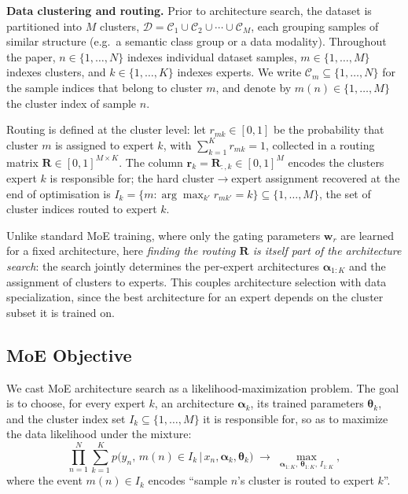 \textbf{Data clustering and routing.}
Prior to architecture search, the dataset is partitioned into $M$ clusters,
$\mathcal{D} = \mathcal{C}_1 \cup \mathcal{C}_2 \cup \cdots \cup \mathcal{C}_M$,
each grouping samples of similar structure (e.g.\ a semantic class group or a data modality). Throughout the paper, $n \in \{1, \ldots, N\}$ indexes individual dataset samples, $m \in \{1, \ldots, M\}$ indexes clusters, and $k \in \{1, \ldots, K\}$ indexes experts. We write $\mathcal{C}_m \subseteq \{1, \ldots, N\}$ for the sample indices that belong to cluster $m$, and denote by $m(n) \in \{1, \ldots, M\}$ the cluster index of sample $n$.

Routing is defined at the cluster level: let $r_{mk} \in [0, 1]$ be the probability that cluster $m$ is assigned to expert $k$, with $\sum_{k=1}^{K} r_{mk} = 1$, collected in a routing matrix $\mathbf{R} \in [0, 1]^{M \times K}$. The column $\mathbf{r}_k = \mathbf{R}_{:,k} \in [0, 1]^M$ encodes the clusters expert $k$ is responsible for; the hard cluster$\to$expert assignment recovered at the end of optimisation is $I_k = \{m : \arg\max_{k'} r_{mk'} = k\} \subseteq \{1, \ldots, M\}$, the set of cluster indices routed to expert $k$.

Unlike standard MoE training, where only the gating parameters $\boldsymbol{w}_r$ are learned for a fixed architecture, here \emph{finding the routing $\mathbf{R}$ is itself part of the architecture search}: the search jointly determines the per-expert architectures $\boldsymbol{\alpha}_{1:K}$ and the assignment of clusters to experts. This couples architecture selection with data specialization, since the best architecture for an expert depends on the cluster subset it is trained on.

\subsection{MoE Objective}
\label{subsec:objective}

We cast MoE architecture search as a likelihood-maximization problem. The goal is to choose, for every expert $k$, an architecture $\boldsymbol{\alpha}_k$, its trained parameters $\boldsymbol{\theta}_k$, and the cluster index set $I_k \subseteq \{1, \ldots, M\}$ it is responsible for, so as to maximize the data likelihood under the mixture:
\begin{equation}
\label{eq:moe_likelihood}
\prod_{n=1}^{N} \sum_{k=1}^{K} p\bigl(y_n,\, m(n) \in I_k \,\big|\, x_n, \boldsymbol{\alpha}_k, \boldsymbol{\theta}_k\bigr)
\;\to\; \max_{\boldsymbol{\alpha}_{1:K},\, \boldsymbol{\theta}_{1:K},\, I_{1:K}},
\end{equation}
where the event $m(n) \in I_k$ encodes ``sample $n$'s cluster is routed to expert $k$''.

